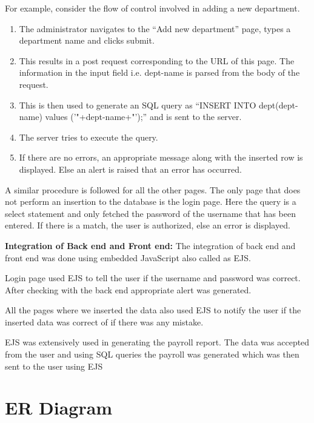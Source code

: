 \documentclass[12pt]{article}
\begin{document}
\newline
\newline
For example, consider the flow of control involved in adding a new department. 
\begin{enumerate}
    \item The administrator navigates to the “Add new department” page, types a department name and clicks submit.
    \item This results in a post request corresponding to the URL of this page. The information in the input field i.e. dept-name is parsed from the body of the request.
    \item This is then used to generate an SQL query as “INSERT INTO dept(dept-name) values ('"+dept-name+"');” and is sent to the server.
    \item The server tries to execute the query.
    \item If there are no errors, an appropriate message along with the inserted row is displayed. Else an alert is raised that an error has occurred.
\end{enumerate}
A similar procedure is followed for all the other pages. The only page that does not perform an insertion to the database is the login page. Here the query is a select statement and only fetched the password of the username that has been entered. If there is a match, the user is authorized, else an error is displayed.

\newpage
\noindent
\textbf{Integration of Back end and Front end:}
\newline\newline
The integration of back end and front end was done using embedded JavaScript also called as EJS.
\item Login page used EJS to tell the user if the username and password was correct. After checking with the back end appropriate alert was generated.
\item All the pages where we inserted the data also used EJS to notify the user if the inserted data was correct of if there was any mistake.
\item EJS was extensively used in generating the payroll report. The data was accepted from the user and using SQL queries the payroll was generated which was then sent to the user using EJS 

\newpage                %
\section{ER Diagram}    %
\end{document}
